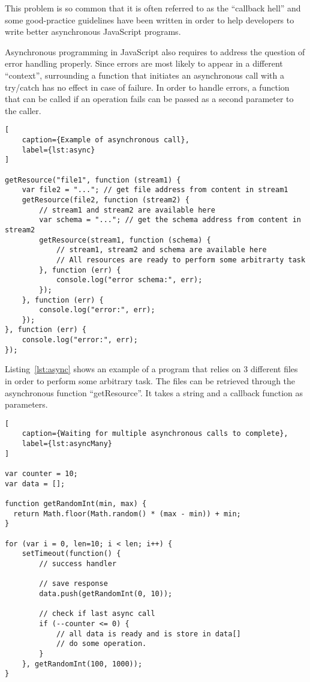 This problem is so common that it is often referred to as the ``callback hell'' and some good-practice guidelines have been written in order to help developers to write better asynchronous JavaScript programs\cite{CallbackHell}.

Asynchronous programming in JavaScript also requires to address the question of error handling properly. Since errors are most likely to appear in a different ``context'', surrounding a function that initiates an asynchronous call with a try/catch has no effect in case of failure. In order to handle errors, a function that can be called if an operation fails can be passed as a second parameter to the caller.

\begin{lstlisting}[
    caption={Example of asynchronous call},
    label={lst:async}
]

getResource("file1", function (stream1) {
    var file2 = "..."; // get file address from content in stream1
    getResource(file2, function (stream2) {
        // stream1 and stream2 are available here
        var schema = "..."; // get the schema address from content in stream2
        getResource(stream1, function (schema) {
            // stream1, stream2 and schema are available here
            // All resources are ready to perform some arbitrarty task
        }, function (err) {
            console.log("error schema:", err);
        });
    }, function (err) {
        console.log("error:", err);
    });
}, function (err) {
    console.log("error:", err);
});
\end{lstlisting}

Listing~\ref{lst:async} shows an example of a program that relies on 3 different files in order to perform some arbitrary task. The files can be retrieved through the asynchronous function ``getResource''. It takes a string and a callback function as parameters.

\begin{lstlisting}[
    caption={Waiting for multiple asynchronous calls to complete},
    label={lst:asyncMany}
]

var counter = 10;
var data = [];

function getRandomInt(min, max) {
  return Math.floor(Math.random() * (max - min)) + min;
}

for (var i = 0, len=10; i < len; i++) {
    setTimeout(function() {
        // success handler

        // save response
        data.push(getRandomInt(0, 10));

        // check if last async call
        if (--counter <= 0) {
            // all data is ready and is store in data[]
            // do some operation.
        }
    }, getRandomInt(100, 1000));
}
\end{lstlisting}

